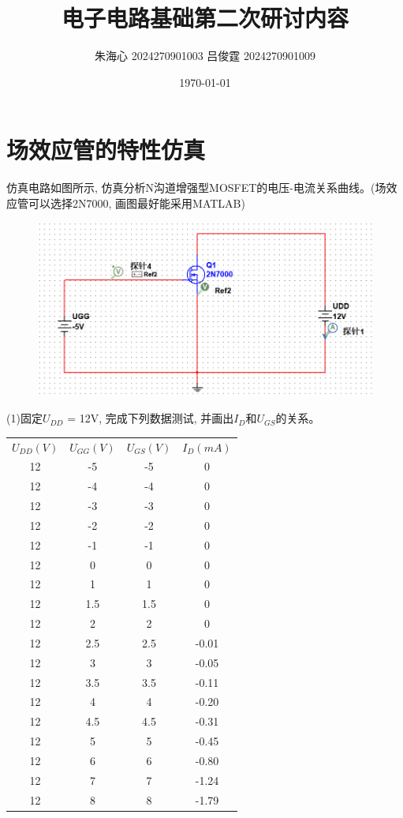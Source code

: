 \documentclass[10pt, a4paper]{article} %
\title{电子电路基础第二次研讨内容}
\author{朱海心 2024270901003 吕俊霆 2024270901009}
\date{\today}
\begin{document}
\maketitle

\section{场效应管的特性仿真}

仿真电路如图所示, 仿真分析N沟道增强型MOSFET的电压-电流关系曲线。(场效应管可以选择2N7000, 画图最好能采用MATLAB)

\begin{figure}[ht]
    \centering
    \includegraphics[width=0.7\linewidth]{image/1.png}
    \label{a}
\end{figure}

(1)固定$U_{DD}$ = 12V, 完成下列数据测试, 并画出$I_D$和$U_{GS}$的关系。

\begin{table}[htbp]
    \centering
    \label{tab:a}
    \begin{tabular}{|c|c|c|c|}
    \hline
    $U_{DD}(V)$&$U_{GG}(V)$&$U_{GS}(V)$&$I_{D}(mA)$\\
    12&-5 &-5 &0    \\ \hline
    12&-4 &-4 &0    \\ \hline
    12&-3 &-3 &0    \\ \hline
    12&-2 &-2 &0    \\ \hline
    12&-1 &-1 &0    \\ \hline
    12&0  &0  &0    \\ \hline
    12&1  &1  &0    \\ \hline
    12&1.5&1.5&0    \\ \hline
    12&2  &2  &0    \\ \hline
    12&2.5&2.5&-0.01\\ \hline
    12&3  &3  &-0.05\\ \hline
    12&3.5&3.5&-0.11\\ \hline
    12&4  &4  &-0.20\\ \hline
    12&4.5&4.5&-0.31\\ \hline
    12&5  &5  &-0.45\\ \hline
    12&6  &6  &-0.80\\ \hline
    12&7  &7  &-1.24\\ \hline
    12&8  &8  &-1.79\\
    \hline
    \end{tabular}
\end{table}
\end{document}
